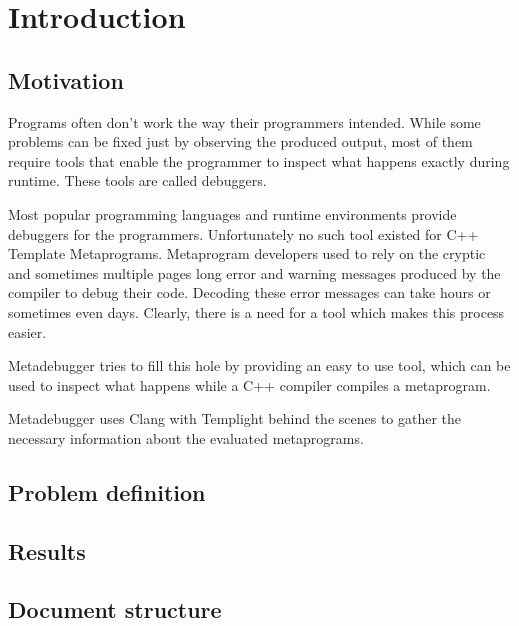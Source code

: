 
\chapter{Introduction}

\section{Motivation}

Programs often don't work the way their programmers intended. While some
problems can be fixed just by observing the produced output, most of them
require tools that enable the programmer to inspect what happens exactly
during runtime. These tools are called debuggers.

Most popular programming languages and runtime environments provide debuggers
for the programmers. Unfortunately no such tool existed for C++ Template
Metaprograms. Metaprogram developers used to rely on the cryptic and sometimes
multiple pages long error and warning messages produced by the compiler to
debug their code. Decoding these error messages can take hours or sometimes
even days. Clearly, there is a need for a tool which makes this process easier.

Metadebugger tries to fill this hole by providing an easy to use tool, which
can be used to inspect what happens while a C++ compiler compiles a
metaprogram.

Metadebugger uses Clang with Templight behind the scenes to gather the
necessary information about the evaluated metaprograms.

\section{Problem definition}

\section{Results} %

\section{Document structure} %
